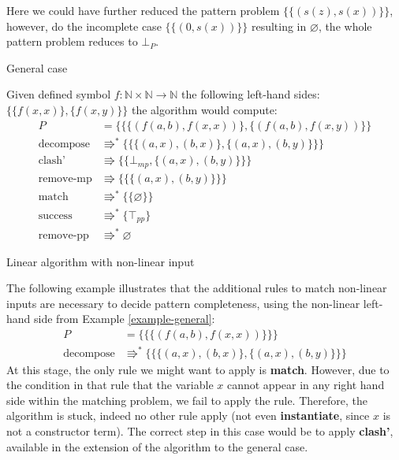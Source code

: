 Here we could have further reduced the pattern problem $\{\{(s(z), s(x))\}\}$, however, do the incomplete case $\{\{(0, s(x))\}\}$ resulting in $\varnothing$, the whole pattern problem reduces to $\bot_{P}$.

\begin{example} \label{example-general} General case

Given defined symbol $f : \mathbb{N} \times \mathbb{N} \rightarrow \mathbb{N}$ the following left-hand sides:\\$\{\{f(x, x)\}, \{f(x, y)\}\}$ the algorithm would compute:
\begin{align*}
    P &= \{\{\{(f(a, b), f(x, x))\}, \{(f(a, b), f(x, y))\}\}\\
\text{decompose} &\Rrightarrow^{*} \{\{\{(a, x), (b, x)\}, \{(a, x), (b, y)\}\}\} \\
\text{clash'} &\Rrightarrow \{\{\bot_{mp}, \{(a, x), (b, y)\}\}\} \\
\text{remove-mp} &\Rrightarrow \{\{\{(a, x), (b, y)\}\}\} \\
\text{match} &\Rrightarrow^{*} \{\{\varnothing\}\} \\
\text{success} &\Rrightarrow^{*} \{\top_{pp}\} \\
\text{remove-pp} &\Rrightarrow^{*} \varnothing
\end{align*}
\end{example}

\vspace{0.2em}
\begin{example} Linear algorithm with non-linear input

The following example illustrates that the additional rules to match non-linear inputs are necessary to decide pattern completeness, using the non-linear left-hand side from Example \ref{example-general}:
\begin{align*}
    P &= \{\{\{(f(a, b), f(x, x))\}\}\}\\
\text{decompose} &\Rrightarrow^{*} \{\{\{(a, x), (b, x)\}, \{(a, x), (b, y)\}\}\}
\end{align*}
At this stage, the only rule we might want to apply is \textbf{match}. However, due to the condition in that rule that the variable $x$ cannot appear in any right hand side within the matching problem, we fail to apply the rule. Therefore, the algorithm is stuck, indeed no other rule apply (not even \textbf{instantiate}, since $x$ is not a constructor term). The correct step in this case would be to apply \textbf{clash'}, available in the extension of the algorithm to the general case.

\end{example}

